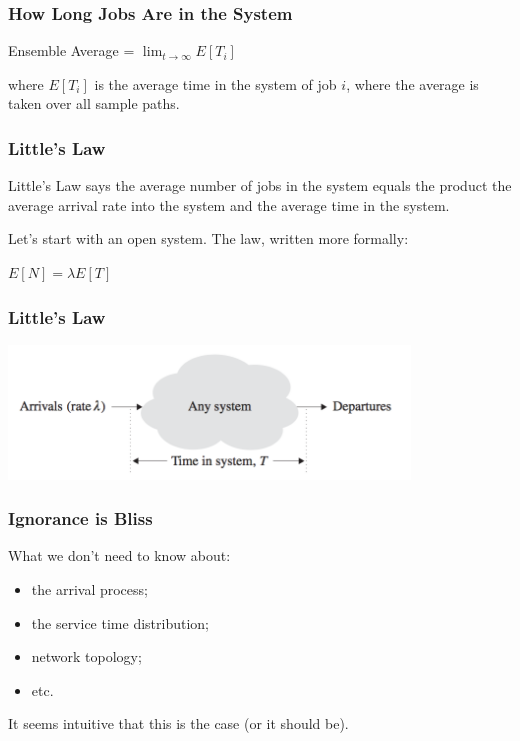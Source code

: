 \begin{frame}
\frametitle{How Long Jobs Are in the System}

\begin{center}
	Ensemble Average = $\lim_{t\to\infty}E[T_{i}]$
\end{center}

where $E[T_{i}]$ is the average time in the system of job $i$, where the average is taken over all sample paths.


\end{frame}

\begin{frame}
\frametitle{Little's Law}

Little's Law says the average number of jobs in the system equals the product the average arrival rate into the system and the average time in the system. 

Let's start with an open system. The law, written more formally:

\begin{center}
	$E[N] = \lambda E[T]$
\end{center}

\end{frame}



\begin{frame}
\frametitle{Little's Law}

\begin{center}
	\includegraphics[width=0.8\textwidth]{images/littleslaw.png}
\end{center}

\end{frame}



\begin{frame}
\frametitle{Ignorance is Bliss}

\large
\begin{changemargin}{1.5cm}
What we don't need to know about:
\begin{itemize}
\item the arrival process;
\item the service time distribution;
\item network topology;
\item etc. 
\end{itemize}

It seems intuitive that this is the case (or it should be). 
\end{changemargin}

\end{frame}



